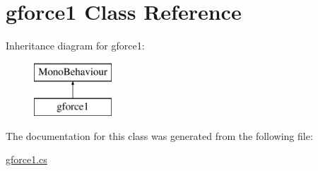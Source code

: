 \hypertarget{classgforce1}{}\section{gforce1 Class Reference}
\label{classgforce1}
Inheritance diagram for gforce1\+:\begin{figure}[H]
\begin{center}
\leavevmode
\includegraphics[height=2.000000cm]{classgforce1}
\end{center}
\end{figure}


The documentation for this class was generated from the following file\+:\begin{DoxyCompactItemize}
\item 
\hyperlink{gforce1_8cs}{gforce1.\+cs}\end{DoxyCompactItemize}
